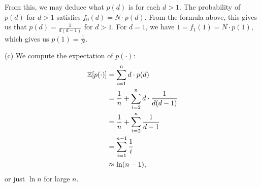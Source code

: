\begin{enumerate}
    From this, we may deduce what $p(d)$ is for each $d > 1$. The probability of $p(d)$ for $d > 1$ satisfies $f_0(d) = N \cdot p(d)$. From the formula above, this gives us that $p(d) = \frac{1}{d(d-1)}$ for $d > 1$. For $d = 1$, we have $1 = f_1(1) = N \cdot p(1)$, which gives us $p(1) = \frac{1}{N}$.
    
    (c) We compute the expectation of $p(\cdot)$:
    \begin{align*}
        \mathbb{E}[p(\cdot)] &= \sum_{i = 1}^n d \cdot p(d) \\
            &= \frac{1}{n} + \sum_{i = 2}^n d \cdot \frac{1}{d(d-1)} \\
            &= \frac{1}{n} + \sum_{i = 2}^n \frac{1}{d - 1} \\
            &= \sum_{i = 1}^{n - 1}\frac{1}{i} \\
            &\approx \ln (n - 1),
    \end{align*}
    or just $\ln n$ for large $n$.
    
\end{enumerate}
